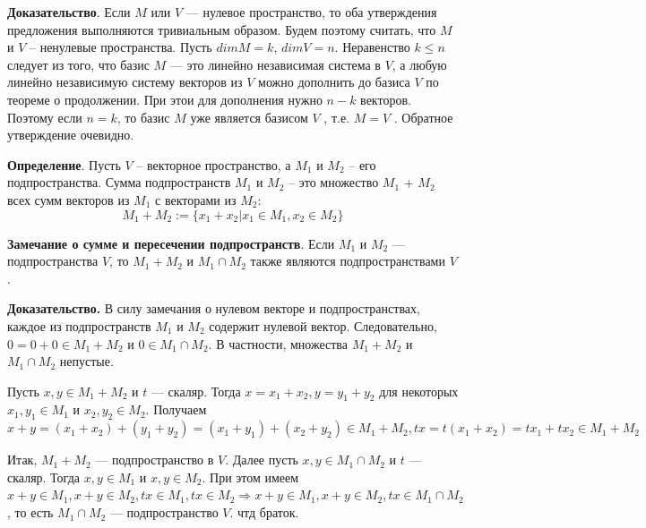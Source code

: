 \documentclass[a4paper]{article}
\begin{document}
    \begin{hproof}
        \textbf{Доказательство}. Если $M$ или $V$ –-- нулевое пространство, то оба
        утверждения предложения выполняются тривиальным образом. Будем
        поэтому считать, что $M$ и $V$ – ненулевые пространства. Пусть $dim M = k$,
        $dim V = n$. Неравенство $k \leq n$ следует из того, что базис $M$ –-- это линейно
        независимая система в $V$, а любую линейно независимую систему
        векторов из $V$ можно дополнить до базиса $V$ по теореме о продолжении. При этои для дополнения нужно $n-k$ векторов. Поэтому если $n=k$, то базис $M$ уже является базисом $V$ , т.е. $M = V$ . Обратное утверждение очевидно.
    \end{hproof}

    \textbf{Определение}. Пусть $V$ – векторное пространство, а $M_1$ и $M_2$ – его подпространства.
    Сумма подпространств $M_1$ и $M_2$ – это множество $M_1$ + $M_2$ всех сумм
    векторов из $M_1$ с векторами из $M_2$:
    \begin{equation}
        M_1+M_2 := \{ x_1 + x_2| x_1 \in M_1, x_2 \in M_2 \}
    \end{equation}

    \begin{htheorem}
        \textbf{Замечание о сумме и пересечении подпространств}. Если $M_1$ и $M_2$ --- подпространства $V$, то $M_1+M_2$ и $M_1 \cap M_2$ также являются подпространствами $V$.
    \end{htheorem}

    \begin{hproof}
        \textbf{Доказательство.} В силу замечания о нулевом векторе и подпространствах,
        каждое из подпространств $M_1$ и $M_2$ содержит нулевой вектор. Следовательно, $0=0+0 \in M_1+M_2$ и $0 \in M_1 \cap M_2$. В частности, множества $M_1+M_2$ и $M_1 \cap M_2$ непустые.

        Пусть $x, y \in M_1+M_2$ и $t$ --- скаляр. Тогда $x=x_1+x_2, y=y_1+y_2$ для некоторых $x_1, y_1 \in M_1$ и $x_2, y_2 \in M_2$. Получаем \begin{equation}
                                                                                                                                                  x+y = (x_1+x_2) + (y_1+y_2) = (x_1+y_1)+(x_2+y_2) \in M_1 + M_2, tx = t(x_1 + x_2) = tx_1 + tx_2 \in M_1 + M_2
        \end{equation}

        Итак, $M_1+M_2$ --- подпространство в $V$. Далее пусть $x, y \in M_1 \cap M_2$ и $t$ --- скаляр. Тогда $x, y \in M_1$ и $x, y \in M_2$. При этом имеем $x+y \in M_1, x+y \in M_2, tx \in M_1, tx \in M_2 \Rightarrow x+y \in M_1, x+y \in M_2, tx \in M_1 \cap M_2$, то есть $M_1 \cap M_2$ --- подпространство $V$. чтд браток.
    \end{hproof}
\end{document}
